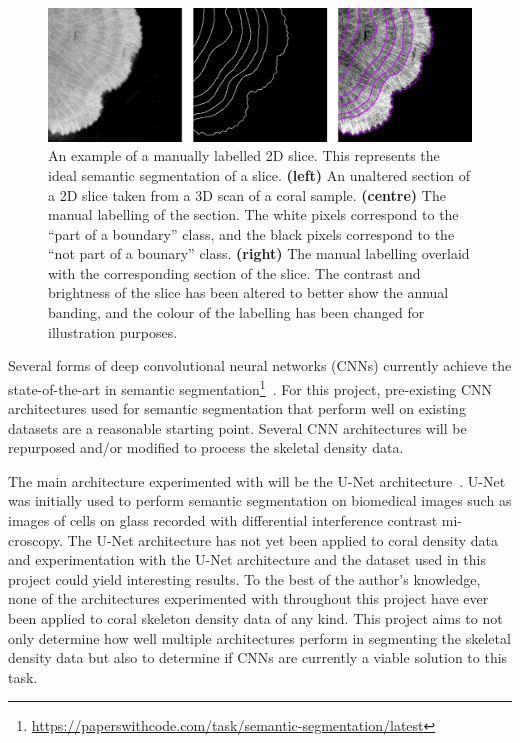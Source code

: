 \begin{figure}[t]
    \centering
    \includegraphics[width=1\textwidth]{images/label-example.png}
    \caption{An example of a manually labelled 2D slice. This represents the ideal semantic segmentation of a slice. \textbf{(left)} An unaltered section of a 2D slice taken from a 3D scan of a coral sample. \textbf{(centre)} The manual labelling of the section. The white pixels correspond to the ``part of a boundary'' class, and the black pixels correspond to the ``not part of a bounary'' class. \textbf{(right)} The manual labelling overlaid with the corresponding section of the slice. The contrast and brightness of the slice has been altered to better show the annual banding, and the colour of the labelling has been changed for illustration purposes.}
    \label{fig:example-label}
\end{figure}

Several forms of deep convolutional neural networks (CNNs) currently achieve the state-of-the-art in semantic segmentation\footnote{\url{https://paperswithcode.com/task/semantic-segmentation/latest}}~\cite{chen2018encoder, semanticseg-SOTA}. For this project, pre-existing CNN architectures used for semantic segmentation that perform well on existing datasets are a reasonable starting point. Several CNN architectures will be repurposed and/or modified to process the skeletal density data.

The main architecture experimented with will be the U-Net architecture~\cite{ronneberger2015u}. U-Net was initially used to perform semantic segmentation on biomedical images such as images of cells on glass recorded with differential interference contrast mi-croscopy. The U-Net architecture has not yet been applied to coral density data and experimentation with the U-Net architecture and the dataset used in this project could yield interesting results. To the best of the author's knowledge, none of the architectures experimented with throughout this project have ever been applied to coral skeleton density data of any kind. This project aims to not only determine how well multiple architectures perform in segmenting the skeletal density data but also to determine if CNNs are currently a viable solution to this task.

